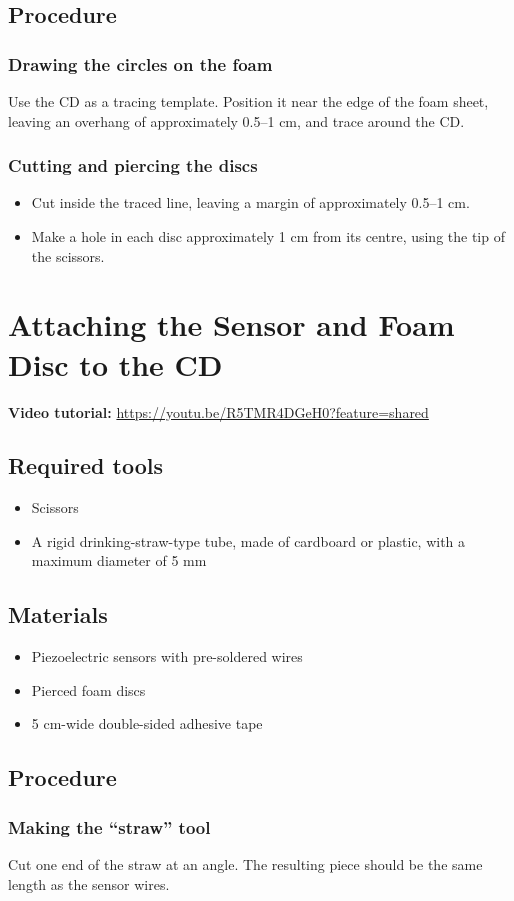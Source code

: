 \documentclass[11pt,a4paper]{article}
\newcommand{\tutorial}[1]{\textbf{Video tutorial:} \url{#1}}
\newcommand{\tools}{\subsection{Required tools}}
\newcommand{\materials}{\subsection{Materials}}
\newcommand{\procedure}{\subsection{Procedure}}
\begin{document}
\procedure
\subsubsection{Drawing the circles on the foam}
Use the CD as a tracing template. Position it near the edge of the foam sheet, leaving an overhang of approximately 0.5--1 cm, and trace around the CD.

\subsubsection{Cutting and piercing the discs}
\begin{itemize}
  \item Cut inside the traced line, leaving a margin of approximately 0.5--1 cm.
  \item Make a hole in each disc approximately 1 cm from its centre, using the tip of the scissors.
\end{itemize}

\section{Attaching the Sensor and Foam Disc to the CD}
\tutorial{https://youtu.be/R5TMR4DGeH0?feature=shared}

\tools
\begin{itemize}
  \item Scissors
  \item A rigid drinking-straw-type tube, made of cardboard or plastic, with a maximum diameter of 5 mm
\end{itemize}

\materials
\begin{itemize}
  \item Piezoelectric sensors with pre-soldered wires
  \item Pierced foam discs
  \item 5 cm-wide double-sided adhesive tape
\end{itemize}

\procedure
\subsubsection{Making the ``straw'' tool}
Cut one end of the straw at an angle. The resulting piece should be the same length as the sensor wires.
\end{document}

